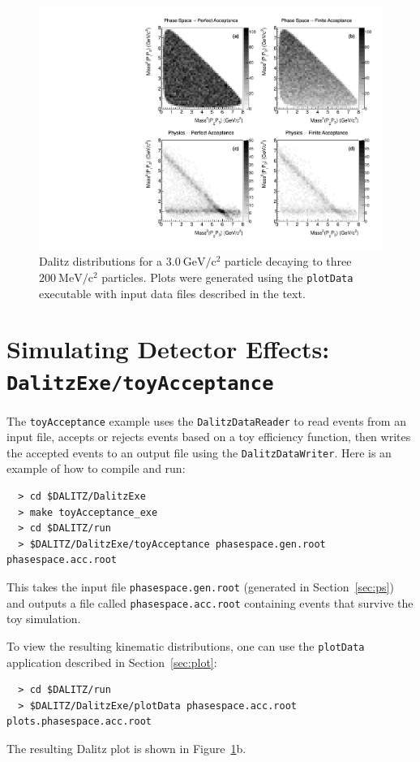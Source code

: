 \documentclass[11pt]{article}
\newcommand{\gevcc}{\mathrm{GeV/c^2}}
\newcommand{\mevcc}{\mathrm{MeV/c^2}}
\begin{document}
\begin{figure}[h!]
\begin{center}
\includegraphics[width=1.0\columnwidth]{figure1.pdf}
\caption{Dalitz distributions for a $3.0~\gevcc$ particle decaying to three $200~\mevcc$ particles.  Plots were generated using the {\tt plotData} executable with input data files described in the text.
\label{fig:dalitz}}
\end{center}
\end{figure}


\section{Simulating Detector Effects: \\
{\tt DalitzExe/toyAcceptance}}
\label{sec:eff}

The {\tt toyAcceptance} example uses the {\tt DalitzDataReader} to read events from an input file, accepts or rejects events based on a toy efficiency function, then writes the accepted events to an output file using the {\tt DalitzDataWriter}.  Here is an example of how to compile and run:
\begin{verbatim}
  > cd $DALITZ/DalitzExe
  > make toyAcceptance_exe
  > cd $DALITZ/run
  > $DALITZ/DalitzExe/toyAcceptance phasespace.gen.root phasespace.acc.root
\end{verbatim}
This takes the input file {\tt phasespace.gen.root} (generated in Section~\ref{sec:ps}) and outputs a file called {\tt phasespace.acc.root} containing events that survive the toy simulation.

To view the resulting kinematic distributions, one can use the {\tt plotData} application described in Section~\ref{sec:plot}:
\begin{verbatim}
  > cd $DALITZ/run
  > $DALITZ/DalitzExe/plotData phasespace.acc.root plots.phasespace.acc.root
\end{verbatim}
The resulting Dalitz plot is shown in Figure~\ref{fig:dalitz}b.
\end{document}

